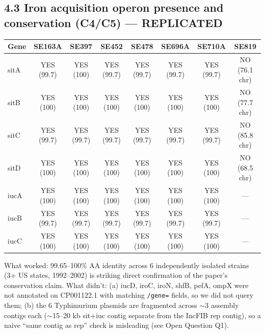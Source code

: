 \documentclass[10pt]{article}
\begin{document}
\subsection{4.3 Iron acquisition operon presence and conservation (C4/C5) --- \textbf{REPLICATED}}
\begin{center}
\begin{tabular}{lccccccc} \toprule
Gene & SE163A & SE397 & SE452 & SE478 & SE696A & SE710A & SE819 \\ \midrule
sitA & YES (99.7) & YES (100) & YES (99.7) & YES (99.7) & YES (99.7) & YES (99.7) & NO (76.1 chr) \\
sitB & YES (100) & YES (100) & YES (100) & YES (100) & YES (100) & YES (100) & NO (77.7 chr) \\
sitC & YES (99.7) & YES (99.7) & YES (99.7) & YES (99.7) & YES (99.7) & YES (99.7) & NO (85.8 chr) \\
sitD & YES (100) & YES (100) & YES (100) & YES (100) & YES (100) & YES (100) & NO (68.5 chr) \\
iucA & YES (100) & YES (100) & YES (100) & YES (100) & YES (100) & YES (100) & --- \\
iucB & YES (99.7) & YES (99.7) & YES (99.7) & YES (99.7) & YES (99.7) & YES (99.7) & --- \\
iucC & YES (100) & YES (100) & YES (100) & YES (100) & YES (100) & YES (100) & --- \\ \bottomrule
\end{tabular}
\end{center}
What worked: 99.65--100\% AA identity across 6 independently isolated strains (3+ US states, 1992--2002) is striking direct confirmation of the paper's conservation claim. What didn't: (a) iucD, iroC, iroN, shfB, pefA, ompX were not annotated on CP001122.1 with matching \texttt{/gene=} fields, so we did not query them; (b) the 6 Typhimurium plasmids are fragmented across $\sim$3 assembly contigs each ($\sim$15--20 kb sit+iuc contig separate from the IncFIB rep contig), so a naive ``same contig as rep'' check is misleading (see Open Question Q1).
\end{document}
